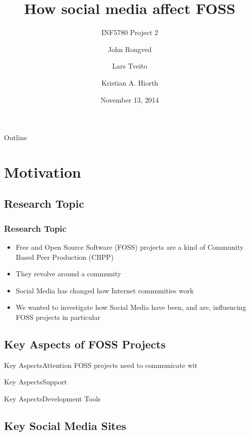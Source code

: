 \documentclass{beamer}
\title{How social media affect FOSS}
\subtitle{INF5780 Project 2}
\author{{John Rongved} \and {Lars Tveito} \and {Kristian A. Hiorth}}
\date{November 13, 2014}
\institute{Department of Informatics\\University of Oslo}
\begin{document}
\begin{frame}
  \titlepage
\end{frame}

\begin{frame}{Outline}
  \tableofcontents{}
\end{frame}

\section{Motivation}

\subsection{Research Topic}

\begin{frame}
  \frametitle{Research Topic}
  \begin{itemize}
  \item Free and Open Source Software (FOSS) projects are a kind of Community
    Based Peer Production (CBPP)
  \item They revolve around a community
  \item Social Media has changed how Internet
    communities work

    \pause

  \item We wanted to investigate how Social Media have been, and are,
    influencing FOSS projects in particular
  \end{itemize}
\end{frame}

\subsection{Key Aspects of FOSS Projects}

\begin{frame}{Key Aspects}{Attention}
  FOSS projects need to communicate wit
\end{frame}

\begin{frame}{Key Aspects}{Support}
\end{frame}

\begin{frame}{Key Aspects}{Development Tools}
\end{frame}

\subsection{Key Social Media Sites}
\end{document}

